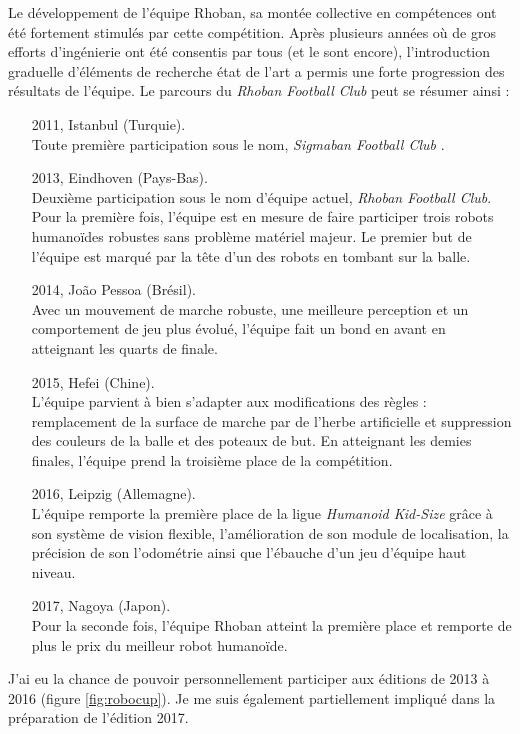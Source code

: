 Le développement de l'équipe Rhoban, sa montée collective en compétences
ont été fortement stimulés par cette compétition.
Après plusieurs années où de gros efforts d'ingénierie ont été consentis 
par tous (et le sont encore), l'introduction graduelle d'éléments de \og recherche \fg état de l'art
a permis une forte progression des résultats de l'équipe.
Le parcours du \textit{Rhoban Football Club} peut se résumer ainsi :
\begin{itemize}
    \item[2011,]Istanbul (Turquie).\\
        Toute première participation 
        sous le nom, \og \textit{Sigmaban Football Club} \fg.
    \item[2013,]Eindhoven (Pays-Bas).\\
        Deuxième participation sous 
        le nom d'équipe actuel, \textit{Rhoban Football Club}.
        Pour la première fois, l'équipe est en mesure
        de faire participer trois robots humanoïdes robustes
        sans problème matériel majeur.
        Le premier but de l'équipe est marqué par la tête 
        d'un des robots en tombant sur la balle.
    \item[2014,]Jo\~ao Pessoa (Brésil).\\
        Avec un mouvement de marche robuste, une meilleure perception
        et un comportement de jeu plus évolué,
        l'équipe fait un bond en avant en atteignant
        les quarts de finale.
    \item[2015,]Hefei (Chine).\\
        L'équipe parvient à bien s'adapter aux modifications des règles :
        remplacement de la surface de marche par de l'herbe artificielle
        et suppression des couleurs de la balle et des poteaux de but.
        En atteignant les demies finales, l'équipe prend la
        troisième place de la compétition.
    \item[2016,]Leipzig (Allemagne).\\
        L'équipe remporte la première place 
        de la ligue \textit{Humanoid Kid-Size}
        grâce à son système de vision flexible, l'amélioration de son
        module de localisation, la précision de son l'odométrie ainsi
        que l'ébauche d'un jeu d'équipe haut niveau.
    \item[2017,]Nagoya (Japon).\\
        Pour la seconde fois, l'équipe Rhoban atteint la première place
        et remporte de plus le prix du meilleur robot humanoïde.
\end{itemize}
J'ai eu la chance de pouvoir personnellement participer 
aux éditions de 2013 à 2016 (figure \ref{fig:robocup}). 
Je me suis également partiellement impliqué dans la préparation de l'édition 2017.

